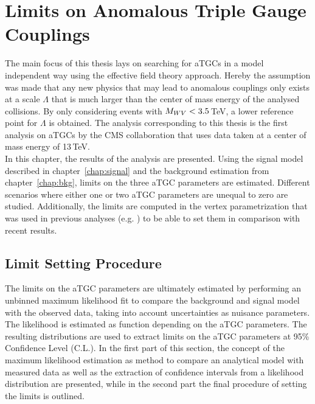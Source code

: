 \chapter{Limits on Anomalous Triple Gauge Couplings}
\label{chap:LimitsonATGCs}
The main focus of this thesis lays on searching for aTGCs in a model independent way using the effective field theory approach. Hereby the assumption was made that any new physics that may lead to anomalous couplings only exists at a scale $\Lambda$ that is much larger than the center of mass energy of the analysed collisions. By only considering events with $M_{WV}<3.5$\,TeV, a lower reference point for $\Lambda$ is obtained. The analysis corresponding to this thesis \cite{PAS} is the first analysis on aTGCs by the CMS collaboration that uses data taken at a center of mass energy of 13\,TeV.\\

\noindent In this chapter, the results of the analysis are presented. Using the signal model described in chapter~\ref{chap:signal} and the background estimation from chapter~\ref{chap:bkg}, limits on the three aTGC parameters are estimated. Different scenarios where either one or two aTGC parameters are unequal to zero are studied. Additionally, the limits are computed in the vertex parametrization that was used in previous analyses (e.g. \cite{aTGC1,aTGC2}) to be able to set them in comparison with recent results.

\section{Limit Setting Procedure}
The limits on the aTGC parameters are ultimately estimated by performing an unbinned maximum likelihood fit to compare the background and signal model with the observed data, taking into account uncertainties as nuisance parameters. The likelihood is estimated as function depending on the aTGC parameters. The resulting distributions are used to extract limits on the aTGC parameters at 95\% Confidence Level (C.L.). In the first part of this section, the concept of the maximum likelihood estimation as method to compare an analytical model with measured data as well as the extraction of confidence intervals from a likelihood distribution are presented, while in the second part the final procedure of setting the limits is outlined.
